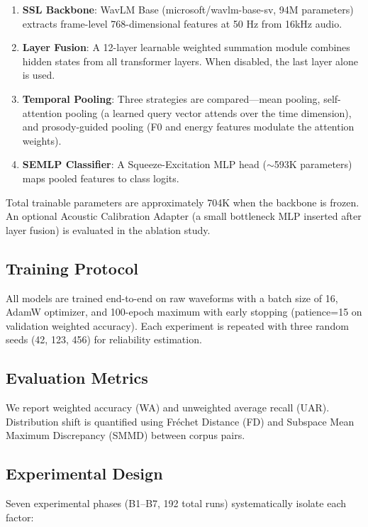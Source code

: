 \begin{enumerate}
    \item \textbf{SSL Backbone}: WavLM Base (microsoft/wavlm-base-sv, 94M parameters) extracts frame-level 768-dimensional features at 50 Hz from 16kHz audio.
    \item \textbf{Layer Fusion}: A 12-layer learnable weighted summation module combines hidden states from all transformer layers. When disabled, the last layer alone is used.
    \item \textbf{Temporal Pooling}: Three strategies are compared---mean pooling, self-attention pooling (a learned query vector attends over the time dimension), and prosody-guided pooling (F0 and energy features modulate the attention weights).
    \item \textbf{SEMLP Classifier}: A Squeeze-Excitation MLP head ($\sim$593K parameters) maps pooled features to class logits.
\end{enumerate}

Total trainable parameters are approximately 704K when the backbone is frozen. An optional Acoustic Calibration Adapter (a small bottleneck MLP inserted after layer fusion) is evaluated in the ablation study.

\subsection{Training Protocol}

All models are trained end-to-end on raw waveforms with a batch size of 16, AdamW optimizer, and 100-epoch maximum with early stopping (patience=15 on validation weighted accuracy). Each experiment is repeated with three random seeds (42, 123, 456) for reliability estimation.

\subsection{Evaluation Metrics}

We report weighted accuracy (WA) and unweighted average recall (UAR). Distribution shift is quantified using Fr\'{e}chet Distance (FD) and Subspace Mean Maximum Discrepancy (SMMD) between corpus pairs.

\subsection{Experimental Design}

Seven experimental phases (B1--B7, 192 total runs) systematically isolate each factor:

